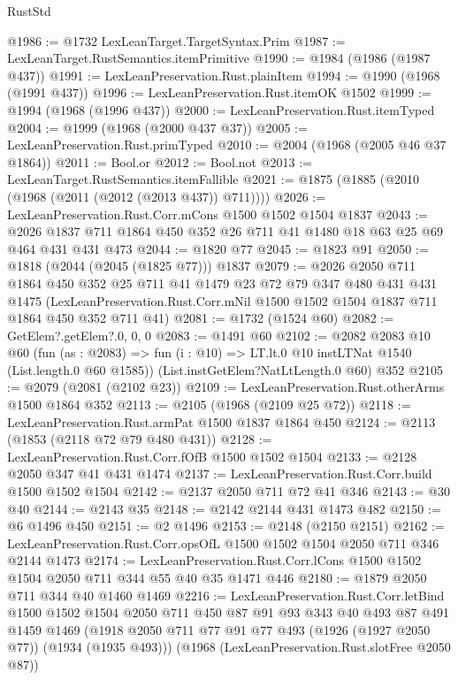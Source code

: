 \begin{lexlean}{RustStd}
\begin{coremodule}
{\begin{coremodule}
{{{{{@1986 := @1732 LexLeanTarget.TargetSyntax.Prim
@1987 := LexLeanTarget.RustSemantics.itemPrimitive
@1990 := @1984 (@1986 (@1987 @437))
@1991 := LexLeanPreservation.Rust.plainItem
@1994 := @1990 (@1968 (@1991 @437))
@1996 := LexLeanPreservation.Rust.itemOK @1502
@1999 := @1994 (@1968 (@1996 @437))
@2000 := LexLeanPreservation.Rust.itemTyped
@2004 := @1999 (@1968 (@2000 @437 @37))
@2005 := LexLeanPreservation.Rust.primTyped
@2010 := @2004 (@1968 (@2005 @46 @37 @1864))
@2011 := Bool.or
@2012 := Bool.not
@2013 := LexLeanTarget.RustSemantics.itemFallible
@2021 := @1875 (@1885 (@2010 (@1968 (@2011 (@2012 (@2013 @437)) @711))))
@2026 := LexLeanPreservation.Rust.Corr.mCons @1500 @1502 @1504 @1837
@2043 := @2026 @1837 @711 @1864 @450 @352 @26 @711 @41 @1480 @18 @63 @25 @69 @464 @431 @431 @473
@2044 := @1820 @77
@2045 := @1823 @91
@2050 := @1818 (@2044 (@2045 (@1825 @77))) @1837
@2079 := @2026
    @2050
    @711
    @1864
    @450
    @352
    @25
    @711
    @41
    @1479
    @23
    @72
    @79
    @347
    @480
    @431
    @431
    @1475
    (LexLeanPreservation.Rust.Corr.mNil @1500 @1502 @1504 @1837 @711 @1864 @450 @352 @711 @41)
@2081 := @1732 (@1524 @60)
@2082 := GetElem?.getElem?.{0, 0, 0}
@2083 := @1491 @60
@2102 := @2082
    @2083
    @10
    @60
    (fun (as : @2083) => fun (i : @10) => LT.lt.{0} @10 instLTNat @1540 (List.length.{0} @60 @1585))
    (List.instGetElem?NatLtLength.{0} @60)
    @352
@2105 := @2079 (@2081 (@2102 @23))
@2109 := LexLeanPreservation.Rust.otherArms @1500 @1864 @352
@2113 := @2105 (@1968 (@2109 @25 @72))
@2118 := LexLeanPreservation.Rust.armPat @1500 @1837 @1864 @450
@2124 := @2113 (@1853 (@2118 @72 @79 @480 @431))
@2128 := LexLeanPreservation.Rust.Corr.fOfB @1500 @1502 @1504
@2133 := @2128 @2050 @347 @41 @431 @1474
@2137 := LexLeanPreservation.Rust.Corr.build @1500 @1502 @1504
@2142 := @2137 @2050 @711 @72 @41 @346
@2143 := @30 @40
@2144 := @2143 @35
@2148 := @2142 @2144 @431 @1473 @482
@2150 := @6 @1496 @450
@2151 := @2 @1496
@2153 := @2148 (@2150 @2151)
@2162 := LexLeanPreservation.Rust.Corr.opsOfL @1500 @1502 @1504 @2050 @711 @346 @2144 @1473
@2174 := LexLeanPreservation.Rust.Corr.lCons
    @1500
    @1502
    @1504
    @2050
    @711
    @344
    @55
    @40
    @35
    @1471
    @446
@2180 := @1879 @2050 @711 @344 @40 @1460 @1469
@2216 := LexLeanPreservation.Rust.Corr.letBind
    @1500
    @1502
    @1504
    @2050
    @711
    @450
    @87
    @91
    @93
    @343
    @40
    @493
    @87
    @491
    @1459
    @1469
    (@1918 @2050 @711 @77 @91 @77 @493 (@1926 (@1927 @2050 @77)) (@1934 (@1935 @493)))
    (@1968 (LexLeanPreservation.Rust.slotFree @2050 @87))
}}}}}
\end{coremodule}}
\end{coremodule}
\end{lexlean}
